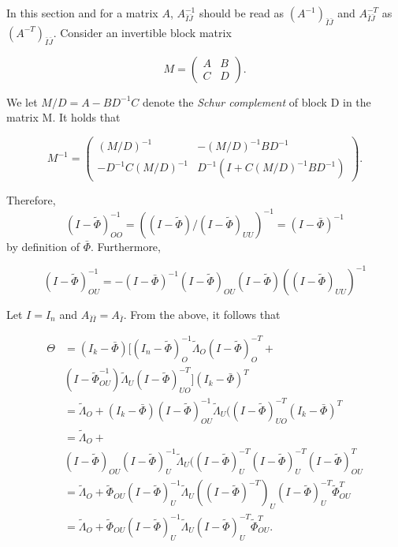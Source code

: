 \documentclass[accepted]{uai2021} %
\begin{document}
In this section and for a matrix $A$, $A_{\bar{I}\bar{J}}^{-1}$ should be read 
as $(A^{-1})_{\bar{I}\bar{J}}$ and $A_{\bar{I}\bar{J}}^{-T}$ as 
$(A^{-T})_{\bar{I}\bar{J}}$. Consider an invertible block matrix 

$$
M=
\begin{pmatrix}
A & B \\
C & D
\end{pmatrix}.
$$

We let $M / D = A - BD^{-1}C$ denote the \emph{Schur complement} of block D in 
the matrix M. It holds that

$$
M^{-1}=
\begin{pmatrix}
(M/D)^{-1} & -(M/D)^{-1}BD^{-1} \\
-D^{-1}C(M/D)^{-1} & D^{-1}(I + C(M/D)^{-1}BD^{-1})
\end{pmatrix}.
$$

Therefore, $$(I - \tilde{\Phi})_{OO}^{-1} = ((I - \tilde{\Phi})/(I - 
\tilde{\Phi})_{UU})^{-1} = (I- \bar{\Phi})^{-1}$$ by definition of 
$\bar{\Phi}$. 
Furthermore, 

$$
(I-\tilde{\Phi})_{OU}^{-1} = 
-(I-\bar{\Phi})^{-1}(I-\tilde{\Phi})_{OU}(I-\tilde{\Phi})((I-\tilde{\Phi})_{UU})^{-1}
$$

Let $I = I_n$ and $A_{\bar{I}\bar{I}} = A_{\bar{I}}$. From the above, it 
follows 
that

\begin{align*}
\Theta & = (I_k - \bar{\Phi})[(I_n - 
\tilde{\Phi})_{O}^{-1}\tilde{\Lambda}_{O}(I - \tilde{\Phi})_{O}^{-T} + \\ 
&  
(I 
- 
\tilde{\Phi}_{OU}^{-1})\tilde{\Lambda}_{U}(I - 
\tilde{\Phi})_{UO}^{-T}](I_k - 
\bar{\Phi})^T \\
& = \tilde{\Lambda}_{O} + (I_k - \bar{\Phi})(I 
- 
\tilde{\Phi})_{OU}^{-1}\tilde{\Lambda}_{U}((I - 
\tilde{\Phi})_{UO}^{-T}(I_k - 
\bar{\Phi})^T \\
& = \tilde{\Lambda}_{O} + \\ & (I - \tilde{\Phi})_{OU}(I - 
\tilde{\Phi})_{U}^{-1}\tilde{\Lambda}_{U}((I - 
\tilde{\Phi})_{U}^{-T}(I - 
\tilde{\Phi})_{U}^{-T}(I - 
\tilde{\Phi})_{OU}^T \\
& = \tilde{\Lambda}_{O} + \tilde{\Phi}_{OU}(I - 
\tilde{\Phi})_{U}^{-1}\tilde{\Lambda}_{U}((I - 
\tilde{\Phi})^{-T})_{U}(I - 
\tilde{\Phi})_{U}^{-T} 
\tilde{\Phi}_{OU}^T \\
& = \tilde{\Lambda}_{O} + \tilde{\Phi}_{OU}(I - 
\tilde{\Phi})_{U}^{-1}\tilde{\Lambda}_{U} (I - 
\tilde{\Phi})_{U}^{-T}
\tilde{\Phi}_{OU}^T.
\end{align*}



\end{document}
